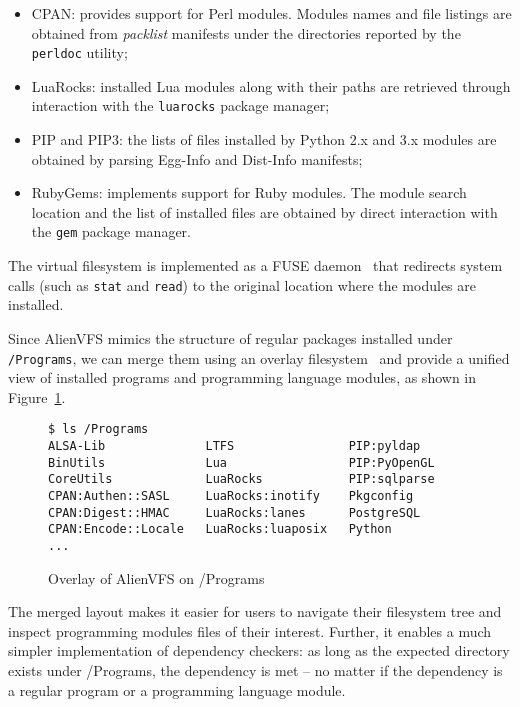 \documentclass[sigplan, anonymous]{acmart}
\begin{document}
\begin{itemize}
    \item CPAN: provides support for Perl modules. Modules names and file listings
        are obtained from \emph{packlist} manifests under the directories reported
        by the \texttt{perldoc} utility;
    \item LuaRocks: installed Lua modules along with their paths are retrieved
        through interaction with the \texttt{luarocks} package manager;
    \item PIP and PIP3: the lists of files installed by Python 2.x and 3.x modules
        are obtained by parsing Egg-Info and Dist-Info manifests;
    \item RubyGems: implements support for Ruby modules. The module search location
        and the list of installed files are obtained by direct interaction with the
        \texttt{gem} package manager.
\end{itemize}

The virtual filesystem is implemented as a FUSE daemon~\cite{miklos2002fuse} that
redirects system calls (such as \texttt{stat} and \texttt{read}) to the original
location where the modules are installed.

Since AlienVFS mimics the structure of regular packages installed under
\texttt{/Programs}, we can merge them using an overlay filesystem~\cite{brown2018overlayfs}
and provide a unified view of installed programs and programming language modules, as
shown in Figure~\ref{fig:alienvfs_merged}.

\begin{figure}
    \label{fig:alienvfs_merged}
    \caption{Overlay of AlienVFS on /Programs}
    \begin{verbatim}
$ ls /Programs
ALSA-Lib              LTFS                PIP:pyldap
BinUtils              Lua                 PIP:PyOpenGL
CoreUtils             LuaRocks            PIP:sqlparse
CPAN:Authen::SASL     LuaRocks:inotify    Pkgconfig
CPAN:Digest::HMAC     LuaRocks:lanes      PostgreSQL
CPAN:Encode::Locale   LuaRocks:luaposix   Python
...
    \end{verbatim}
\end{figure}

The merged layout makes it easier for users to navigate their filesystem tree
and inspect programming modules files of their interest. Further, it enables a
much simpler implementation of dependency checkers: as long as the expected
directory exists under /Programs, the dependency is met -- no matter if the
dependency is a regular program or a programming language module.
\end{document}
